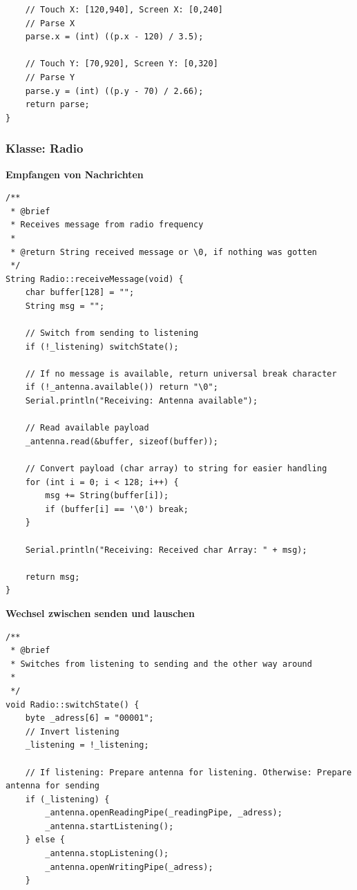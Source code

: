 \documentclass[a4paper, 11pt]{scrartcl}
\begin{document}
\begin{small}
\begin{lstlisting}
    // Touch X: [120,940], Screen X: [0,240]
    // Parse X
    parse.x = (int) ((p.x - 120) / 3.5);

    // Touch Y: [70,920], Screen Y: [0,320]
    // Parse Y
    parse.y = (int) ((p.y - 70) / 2.66);
    return parse;
}
\end{lstlisting}

\subsubsection{Klasse: Radio}
\textbf{Empfangen von Nachrichten}\label{code:receive}
\begin{lstlisting}
/**
 * @brief 
 * Receives message from radio frequency
 * 
 * @return String received message or \0, if nothing was gotten
 */
String Radio::receiveMessage(void) {
    char buffer[128] = "";
    String msg = "";

    // Switch from sending to listening
    if (!_listening) switchState();

    // If no message is available, return universal break character
    if (!_antenna.available()) return "\0";
    Serial.println("Receiving: Antenna available");

    // Read available payload
    _antenna.read(&buffer, sizeof(buffer));

    // Convert payload (char array) to string for easier handling
    for (int i = 0; i < 128; i++) {
        msg += String(buffer[i]);
        if (buffer[i] == '\0') break;
    }

    Serial.println("Receiving: Received char Array: " + msg);

    return msg;
}
\end{lstlisting}

\begin{flushleft}\textbf{Wechsel zwischen senden und lauschen}\label{code:switch}\end{flushleft}
\begin{lstlisting}
/**
 * @brief 
 * Switches from listening to sending and the other way around
 * 
 */
void Radio::switchState() {
    byte _adress[6] = "00001";
    // Invert listening
    _listening = !_listening;

    // If listening: Prepare antenna for listening. Otherwise: Prepare antenna for sending
    if (_listening) {
        _antenna.openReadingPipe(_readingPipe, _adress);
        _antenna.startListening();
    } else {
        _antenna.stopListening();
        _antenna.openWritingPipe(_adress);
    }


\end{lstlisting}
\end{small}
\end{document}
